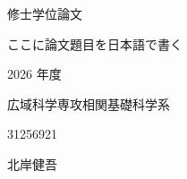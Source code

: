 %
%
%
%     
%

\newcommand{\thesisTitleJa}{ここに論文題目を日本語で書く}

\newcommand{\academicYear}{2026 年度}
\newcommand{\departmentLine}{広域科学専攻\quad 相関基礎科学系}
\newcommand{\studentID}{31256921}
\newcommand{\authorNameJa}{北岸\quad 健吾}

\begin{titlepage}
\thispagestyle{empty}
\centering
\vspace*{4cm}

{\Large 修士学位論文}

\vspace{3cm}

{\LARGE \thesisTitleJa}


\vfill

{\large \academicYear}

\vspace{0.6cm}
{\large \departmentLine}

\vspace{0.6cm}
{\large \studentID}

\vspace{0.6cm}
{\large \authorNameJa}

\vspace{3cm}
\end{titlepage}
